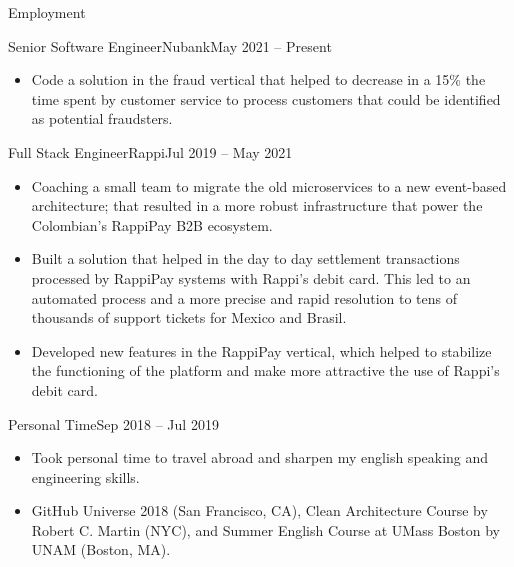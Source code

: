 \documentclass[calibri]{../macdowell-cv/mcdowellcv}
\begin{document}
	\begin{cvsection}{Employment}
		\begin{cvsubsection}{Senior Software Engineer}{Nubank}{May 2021 -- Present}
			\begin{itemize}
				\item Code a solution in the fraud vertical that helped to decrease in a 15\% the time spent by customer service to process customers that could be identified as potential fraudsters. 
			\end{itemize}
		\end{cvsubsection}

		\begin{cvsubsection}{Full Stack Engineer}{Rappi}{Jul 2019 -- May 2021}
			\begin{itemize}
				\item Coaching a small team to migrate the old microservices to a new event-based architecture; that resulted in a more robust infrastructure that power the Colombian's RappiPay B2B ecosystem.
			\end{itemize}
			\begin{itemize}
				\item Built a solution that helped in the day to day settlement transactions processed by RappiPay systems with Rappi's debit card. This led to an automated process and a more precise and rapid resolution to tens of thousands of support tickets for Mexico and Brasil.
			\end{itemize}
			\begin{itemize}
				\item Developed new features in the RappiPay vertical, which helped to stabilize the functioning of the platform and make more attractive the use of Rappi's debit card.
			\end{itemize}
		\end{cvsubsection}

		\begin{cvsubsection}{}{Personal Time}{Sep 2018 -- Jul 2019}
			\begin{itemize}
				\item Took personal time to travel abroad and sharpen my english speaking and engineering skills.
				\item GitHub Universe 2018 (San Francisco, CA), Clean Architecture Course by Robert C. Martin (NYC), and Summer English Course at UMass Boston by UNAM (Boston, MA).
			\end{itemize}
		\end{cvsubsection}


\end{cvsection}
\end{document}
